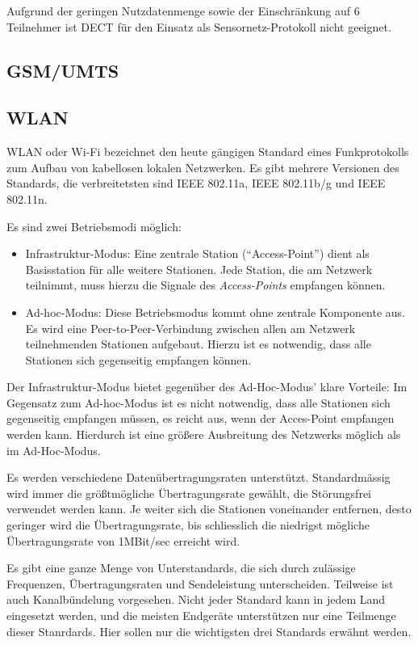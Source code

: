 Aufgrund der geringen Nutzdatenmenge sowie der Einschränkung auf 6 Teilnehmer ist
DECT für den Einsatz als Sensornetz-Protokoll nicht geeignet.

\subsection{GSM/UMTS}
\subsection{WLAN}

WLAN oder Wi-Fi bezeichnet den heute gängigen Standard eines Funkprotokolls zum Aufbau
von kabellosen lokalen Netzwerken. Es gibt mehrere Versionen des Standards, die verbreitetsten
sind IEEE 802.11a, IEEE 802.11b/g und IEEE 802.11n. 

Es sind zwei Betriebsmodi möglich:

\begin{itemize}
    \item{Infrastruktur-Modus:} Eine zentrale Station ("`Access-Point"') dient als Basisstation
                                für alle weitere Stationen. Jede Station, die am Netzwerk
                                teilnimmt, muss hierzu die Signale des \textsl{Access-Points} 
                                empfangen können.
    \item{Ad-hoc-Modus:} Diese Betriebsmodus kommt ohne zentrale Komponente aus. Es wird eine
                         Peer-to-Peer-Verbindung zwischen allen am Netzwerk teilnehmenden 
                         Stationen aufgebaut. Hierzu ist es notwendig, dass alle Stationen
                         sich gegenseitig empfangen können.
\end{itemize}

Der Infrastruktur-Modus bietet gegenüber des Ad-Hoc-Modus' klare Vorteile: Im Gegensatz
zum Ad-hoc-Modus ist es nicht notwendig, dass alle Stationen sich gegenseitig empfangen
müssen, es reicht aus, wenn der Acces-Point empfangen werden kann. Hierdurch ist eine
größere Ausbreitung des Netzwerks möglich als im Ad-Hoc-Modus. 

Es werden verschiedene Datenübertragungsraten unterstützt. Standardmässig wird
immer die größtmögliche Übertragungsrate gewählt, die Störungsfrei verwendet
werden kann. Je weiter sich die Stationen voneinander entfernen, desto geringer
wird die Übertragungsrate, bis schliesslich die niedrigst mögliche Übertragungsrate von
1MBit/sec erreicht wird.

Es gibt eine ganze Menge von Unterstandards, die sich durch zulässige Frequenzen, 
Übertragungsraten und Sendeleistung unterscheiden. Teilweise ist auch Kanalbündelung 
vorgesehen. Nicht jeder Standard kann in jedem Land eingesetzt werden, und die meisten
Endgeräte unterstützen nur eine Teilmenge dieser Stanrdards. Hier sollen nur die
wichtigsten drei Standards erwähnt werden.

